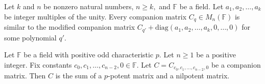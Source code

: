 \documentclass[10pt,a4paper]{amsart}
\newcommand{\F}{\mathbb{F}}
\newcommand{\diag}{\mathrm{diag}}
\begin{document}
\begin{lem}\label{use1}
 Let $k$ and $n$ be nonzero natural numbers, $n\geq k,$ and $\F$ be a field. Let $a_1,a_2,\dots,a_k$ be integer multiples of the unity. Every companion matrix $C_q\in M_n(\mathbb{F})$ is similar to the modified companion matrix  $C_{q'}+\diag (a_1,a_2,\dots,a_k,0,\dots,0)$ for some polynomial $q'.$
\end{lem}

\begin{lem}\label{traceless}
Let $\F$ be a field with positive odd characteristic $p.$ Let $n\geq 1$ be a positive integer. Fix constants $c_0, c_1,\dots,c_{n-2},0\in \F.$
Let $C=C_{c_0,c_1,\ldots,c_{n-2},0}$ be a companion matrix. Then $C$ is the sum of a $p$-potent matrix and a nilpotent matrix.
\end{lem}
\end{document}
